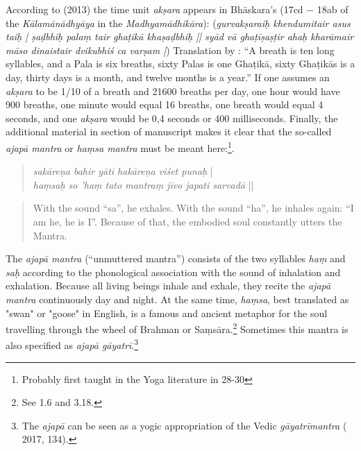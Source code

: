 {According to \citeauthor{birch2013} (2013) the time unit \textit{akṣara} appears in Bhāskara's  (17cd − 18ab of the \textit{Kālamānādhyāya} in the \textit{Madhyamādhikāra}): (\textit{gurvakṣaraiḥ khendumitair asus taiḥ | ṣaḍbhiḥ palaṃ tair ghaṭikā khaṣaḍbhiḥ || syād vā ghaṭīṣaṣṭir ahaḥ kharāmair māso dinaistair dvikubhiś ca varṣam |}) Translation by \citeauthor[2013:265, n. 46]{birch2013}: ``A breath is ten long syllables, and a Pala is six breaths, sixty Palas is one Ghaṭikā, sixty Ghaṭikās is a day, thirty days is a month, and twelve months is a year.'' If one assumes an \textit{akṣara} to be 1/10 of a breath and 21600 breaths per day, one hour would have 900 breaths, one minute would equal 16 breaths, one breath would equal 4 seconds, and one \textit{akṣara} would be 0,4 seconds or 400 milliseconds.\label{ghatinote}} Finally, the additional material in section  of manuscript  makes it clear that the so-called \textit{ajapā mantra} or \textit{haṃsa mantra} must be meant here:\footnote{Probably first taught in the Yoga literature in  28-30}.
    
  \begin{quote}
    \textit{sakāreṇa bahir yāti hakāreṇa viśet punaḥ} |\\  
    \textit{haṃsaḥ so 'haṃ tato mantraṃ jīvo japati sarvadā} ||
    \end{quote}
  \begin{quote}
With the sound ``sa'', he exhales. With the sound ``ha'', he inhales again: ``I am he, he is I''. Because of that, the embodied soul constantly utters the Mantra.
\end{quote}

The \textit{ajapā mantra} (``unmuttered mantra'') consists of the two syllables \textit{haṃ} and \textit{saḥ} according to the phonological association with the sound of inhalation and exhalation. Because all living beings inhale and exhale, they recite the \textit{ajapā mantra} continuously day and night. At the same time, \textit{haṃsa}, best translated as "swan" or "goose" in English, is a famous and ancient metaphor for the soul travelling through the wheel of Brahman or Saṃsāra.\footnote{See  1.6 and 3.18.} Sometimes this mantra is also specified as \textit{ajapā gāyatrī}.\footnote{The \textit{ajapā} can be seen as a yogic appropriation of the Vedic \textit{gāyatrīmantra} ( 2017, 134).}  

